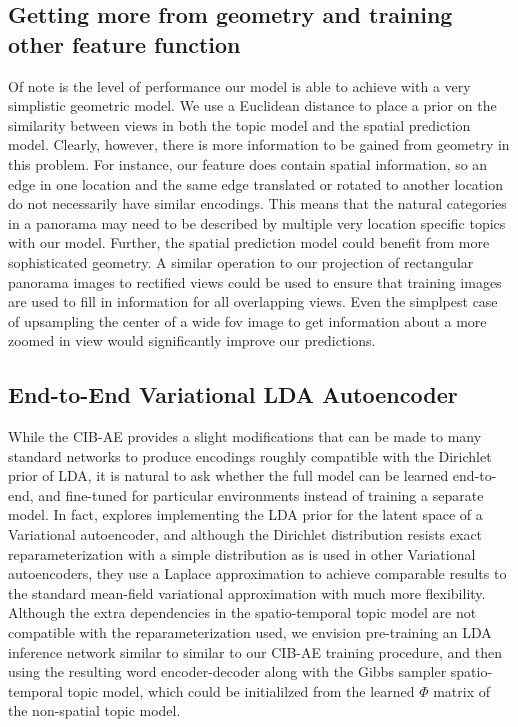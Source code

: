 \subsection{Getting more from geometry and training other feature function}
Of note is the level of performance our model is able to achieve with a very simplistic geometric model. We use a Euclidean distance to place a prior on the similarity between views in both the topic model and the spatial prediction model. Clearly, however, there is more information to be gained from geometry in this problem. For instance, our feature does contain spatial information, so an edge in one location and the same edge translated or rotated to another location do not necessarily have similar encodings. This means that the natural categories in a panorama may need to be described by multiple very location specific topics with our model. Further, the spatial prediction model could benefit from more sophisticated geometry. A similar operation to our projection of rectangular panorama images to rectified views could be used to ensure that training images are used to fill in information for all overlapping views. Even the simplpest case of upsampling the center of a wide fov image to get information about a more zoomed in view would significantly improve our predictions.

\subsection{End-to-End Variational LDA Autoencoder}
While the CIB-AE provides a slight modifications that can be made to many standard networks to produce encodings roughly compatible with the Dirichlet prior of LDA, it is natural to ask whether the full model can be learned end-to-end, and fine-tuned for particular environments instead of training a separate model. In fact, \citep{srivastava2017autoencoding} explores implementing the LDA prior for the latent space of a Variational autoencoder, and although the Dirichlet distribution resists exact reparameterization with a simple distribution as is used in other Variational autoencoders, they use a Laplace approximation to achieve comparable results to the standard mean-field variational approximation with much more flexibility. Although the extra dependencies in the spatio-temporal topic model are not compatible with the reparameterization used, we envision pre-training an LDA inference network similar to \citet{srivastava2017autoencoding} similar to our CIB-AE training procedure, and then using the resulting word encoder-decoder along with the Gibbs sampler spatio-temporal topic model, which could be initialilzed from the learned $\Phi$ matrix of the non-spatial topic model.